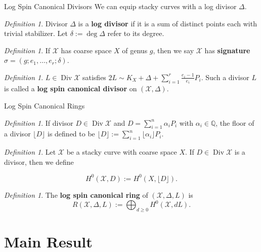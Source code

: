 \documentclass{beamer}
\theoremstyle{remark}
\newtheorem{defn}[thm]{Definition}
\newcommand\BQ{{\mathbb Q}}
\newcommand \sx{{\mathscr X}}
\DeclareMathOperator\di{Div}
\newcommand{\halfcan}{L}
\begin{document}
\begin{frame}{Log Spin Canonical Divisors}
We can equip stacky curves with a log divisor $\Delta$.

\begin{defn}
Divisor $\Delta$ is a \textbf{log divisor} if it is a sum of distinct
points each with trivial stabilizer. Let $\delta := \deg \Delta$
refer to its degree.
\end{defn}


\begin{defn}
If $\sx$ has coarse space $X$ of genus $g$, then we say $\sx$ has
\textbf{signature} $\sigma = (g; e_1, \ldots, e_r; \delta)$.
\end{defn}


\begin{defn}
$\halfcan \in \di
\sx$ satisfies $2 \halfcan \sim K_X + \Delta + \sum_{i = 1}^{r}
\frac{e_i - 1}{e_i} P_i$. Such a divisor $\halfcan$ is called a
\textbf{log spin canonical divisor} on $(\sx, \Delta)$.
\end{defn}

\end{frame}


\begin{frame}{Log Spin Canonical Rings}

\begin{defn}
If divisor $D \in \di \sx$ and $D = \sum_{i = 1}^{n} \alpha_i P_i$
with $\alpha_i \in \BQ$, the floor of a divisor $\lfloor D
\rfloor$ is defined to be $\lfloor D \rfloor := \sum_{i = 1}^{n}
\lfloor \alpha_i \rfloor P_i$.
\end{defn}

\begin{defn}
Let $\sx$ be a stacky curve with coarse space $X$.
If $D \in \di \sx$ is a divisor, then we define

\[
	H^0(\sx, D) := H^0(X, \lfloor D \rfloor).
\]
\end{defn}

\begin{defn}
The {\bf log spin canonical ring} of $(\sx, \Delta, \halfcan)$ is
\[
	R(\sx, \Delta, \halfcan) := \bigoplus_{d \geq 0} H^0(\sx, d \halfcan).
\]
\end{defn}

\end{frame}

\section{Main Result}
\end{document}
